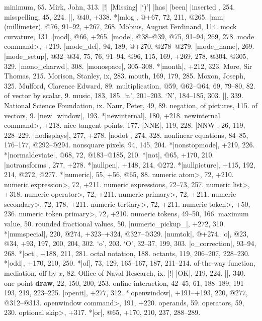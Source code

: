 minimum, 65.
Mirk, John, 313.
|!| |Missing| |`)'| |has| |been| |inserted|, 254.
misspelling, 45, 224.
|\mixture|, @40, +338.
*|mlog|, @+67, 72, 211, @265.
|mm| (millimeter), @76, 91--92, +267, 268.
M\"obius, August Ferdinand, 114.
mock curvature, 131.
|mod|, @66, +265.
|mode|, @38--@39, @75, 91--94, 269, 278.
\<mode command>, +219.
|mode_def|, 94, 189, @+270, @278--@279.
|mode_name|, 269.
|mode_setup|, @32--@34, 75, 76, 91--94, @96, 115, 169, +269, 278, @304, @305,
 329.
|mono_charwd|, 308.
|monospace|, 305--308.
*|month|, +212, 323.
More, Sir Thomas, 215.
Morison, Stanley, ix, 283.
mouth, 169, 179, 285.
Moxon, Joseph, 325.
Mulford, Clarence Edward, 89.
multiplication, @59, @62--@64, 69, 79--80, 82.
\sub of vector by scalar, 9.
music, 183, 185.
\newletter
`n', 201--203.
`N', 184--185, 303.
|\names|, 339.
National Science Foundation, ix.
Naur, Peter, 49, 89.
negation, of pictures, 115.
\sub of vectors, 9.
|new_window|, 193.
*|newinternal|, 180, +218.
\<newinternal command>, +218.
nice tangent points, 177.
|NNE|, 119, 228.
|NNW|, 26, 119, 228--229.
|nodisplays|, 277, +278.
|nodot|, 274, 328.
nonlinear equations, 84--85, 176--177, @292--@294.
nonsquare pixels, 94, 145, 204.
*|nonstopmode|, +219, 226.
*|normaldeviate|, @68, 72, @183--@185, 210.
*|not|, @65, +170, 210.
|notransforms|, 277, +278.
*|nullpen|, +148, 214, @272.
*|nullpicture|, +115, 192, 214, @272, @277.
*|numeric|, 55, +56, @65, 88.
\<numeric atom>, 72, +210.
\<numeric expression>, 72, +211.
numeric expressions, 72--73, 257.
\<numeric list>, +318.
\<numeric operator>, 72, +211.
\<numeric primary>, 72, +211.
\<numeric secondary>, 72, 178, +211.
\<numeric tertiary>, 72, +211.
\<numeric token>, +50, 236.
\<numeric token primary>, 72, +210.
numeric tokens, 49--50, 166.
\sub maximum value, 50.
\sub rounded fractional values, 50.
|numeric_pickup_|, +272, 310.
*|numspecial|, 220, @274, +323--+324, @327--@329.
|numtok|, @+274.
\newletter
|o|, @23, @34, +93, 197, 200, 204, 302.
`o', 203.
`O', 32--37, 199, 303.
|o_correction|, 93--94, 268.
*|oct|, +188, 211, 281.
octal notation, 188.
octants, 119, 206--207, 228--230.
*|odd|, +170, 210, 250.
*|of|, 73, 129, 165--167, 187, 211--214.
of-the-way function, \see mediation.
off by $x$, 82.
Office of Naval Research, ix.
|!| |OK|, 219, 224.
|\omitaccents|, 340.
one-point {\bf draw}, 22, 150, 200, 253.
online interaction, 42--45, 61, 188--189, 191--193, 219, 223--225.
|openit|, +277, 312.
*|openwindow|, +191--+193, 220, @277, @312--@313.
\<openwindow command>, 191, +220.
operands, 59.
operators, 59, 230.
\<optional skip>, +317.
*|or|, @65, +170, 210, 237, 288--289.
